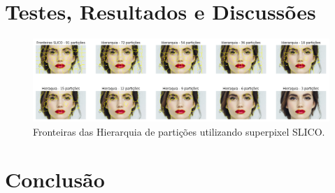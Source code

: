 \begin{document}


\section{Testes, Resultados e Discussões} \label{sec:testes}


\begin{figure}[ht]
\centering
\includegraphics[width=1.\textwidth]{slic_hierarquia_particoes.png}
\caption{Fronteiras das Hierarquia de partições utilizando superpixel SLICO.}
\label{alg:SLIC}
\end{figure}


\section{Conclusão} \label{sec:conclusao}




\end{document}
